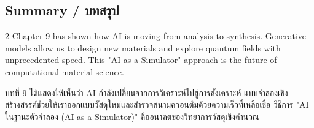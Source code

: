 \subsection{Summary \quad / \quad \textthai{บทสรุป}}
\begin{paracol}{2}
Chapter 9 has shown how AI is moving from analysis to synthesis. Generative models allow us to design new materials and explore quantum fields with unprecedented speed. This "AI as a Simulator" approach is the future of computational material science.

\switchcolumn

\begin{thai}
บทที่ 9 ได้แสดงให้เห็นว่า AI กำลังเปลี่ยนจากการวิเคราะห์ไปสู่การสังเคราะห์ แบบจำลองเชิงสร้างสรรค์ช่วยให้เราออกแบบวัสดุใหม่และสำรวจสนามควอนตัมด้วยความเร็วที่เหลือเชื่อ วิธีการ "AI ในฐานะตัวจำลอง (AI as a Simulator)" คืออนาคตของวิทยาการวัสดุเชิงคำนวณ
\end{thai}
\end{paracol}
